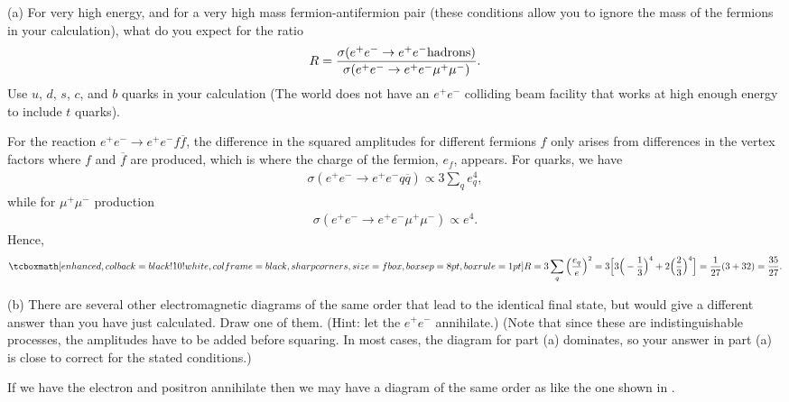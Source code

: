 (a) For very high energy, and for a very high mass fermion-antifermion pair (these conditions allow you to ignore the mass of the fermions in your calculation), what do you expect for the ratio
\begin{eqnarray}
    \label{eq:ratio}
    R = \frac{\sigma(e^{+}e^{-} \rightarrow e^{+}e^{-}{\rm hadrons})}{\sigma(e^{+}e^{-} \rightarrow e^{+}e^{-}\mu^{+}\mu^{-})}
.\end{eqnarray}
Use $u$, $d$, $s$, $c$, and $b$ quarks in your calculation (The world does not have an $e^{+}e^{-}$ colliding beam facility that works at high enough energy to include $t$ quarks).

For the reaction $e^{+}e^{-} \rightarrow e^{+}e^{-}f\overline{f}$, the difference in the squared amplitudes for different fermions $f$ only arises from differences in the vertex factors where $f$ and $\overline{f}$ are produced, which is where the charge of the fermion, $e_{f}$, appears.
For quarks, we have 
\begin{eqnarray}
    \label{eq:sigma-quarks}
    \sigma(e^{+}e^{-} \rightarrow e^{+}e^{-}q\overline{q}) \propto 3\sum_{q} e_{q}^4
,\end{eqnarray}
while for $\mu^{+}\mu^{-}$ production
\begin{eqnarray}
    \label{eq:sigma-mu}
    \sigma(e^{+}e^{-} \rightarrow e^{+}e^{-}\mu^{+}\mu^{-}) \propto e^4
.\end{eqnarray}
Hence,
\begin{eqnarray}
    \label{eq:ratio-calculation}
    \eqbox{
    R = 3 \sum_{q} \Big( \frac{e_{q}}{e} \Big)^2 = 3\Big[3\Big(-\frac{1}{3}\Big)^4 + 2\Big(\frac{2}{3}\Big)^4\Big] = \frac{1}{27}(3 + 32) = \frac{35}{27}
}
.\end{eqnarray}



(b) There are several other electromagnetic diagrams of the same order that lead to the identical final state, but would give a different answer than you have just calculated.
Draw one of them. (Hint: let the $e^{+}e^{-}$ annihilate.)
(Note that since these are indistinguishable processes, the amplitudes have to be added before squaring.
In most cases, the diagram for part (a) dominates, so your answer in part (a) is close to correct for the stated conditions.)

If we have the electron and positron annihilate then we may have a diagram of the same order as  like the one shown in .

